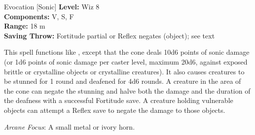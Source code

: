 {Evocation [Sonic]}
{
	\textbf{Level:}
	Wiz 8\\
	\textbf{Components:}
	V, S, F\\
	\textbf{Range:}
	18 m\\
	\textbf{Saving Throw:}
	Fortitude partial or Reflex negates (object); see text\\
}
{
	This spell functions like , except that the cone deals 10d6 points of sonic damage (or 1d6 points of sonic damage per caster level, maximum 20d6, against exposed brittle or crystalline objects or crystalline creatures). It also causes creatures to be stunned for 1 round and deafened for 4d6 rounds. A creature in the area of the cone can negate the stunning and halve both the damage and the duration of the deafness with a successful Fortitude save. A creature holding vulnerable objects can attempt a Reflex save to negate the damage to those objects.

	\textit{Arcane Focus}:
	A small metal or ivory horn.

}
